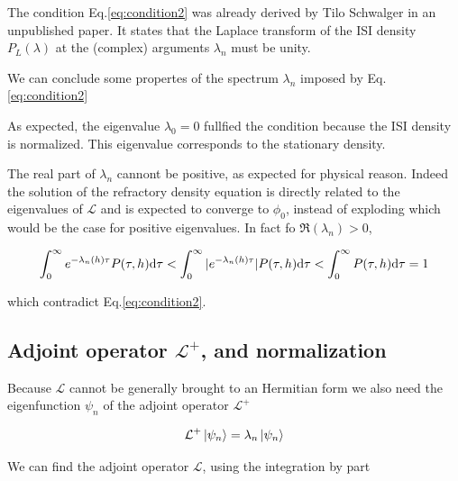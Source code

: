 \documentclass[a4paper,11pt,twoside]{article}
\def \dd  {{\rm d}}
\numberwithin{equation}{section}
\begin{document}
The condition Eq.\eqref{eq:condition2} was already derived by Tilo Schwalger in an unpublished paper. It states that the Laplace transform of the ISI density $P_L(\lambda)$ at the (complex) arguments $\lambda_{n}$ must be unity. 

We can conclude some propertes of the spectrum {$\lambda_n$} imposed by Eq.\eqref{eq:condition2}

As expected, the eigenvalue $\lambda_0=0$ fullfied the condition because the ISI  density is normalized. This eigenvalue corresponds to the stationary density.

The real part of $\lambda_n$ cannont be positive, as expected for physical reason. Indeed the solution of the refractory density equation is directly related to the eigenvalues of $\mathcal{L}$ and is expected to converge to $\phi_0$, instead of exploding which would be the case for positive eigenvalues. In fact fo $\Re(\lambda_n)>0$,

\begin{equation}
\int_0^\infty e^{-\lambda_n(h) \tau} P(\tau,h) \dd\tau<\int_0^\infty |e^{-\lambda_n(h) \tau} |P(\tau,h) \dd\tau<\int_0^\infty P(\tau,h) \dd\tau=1
\end{equation}

which contradict Eq.\eqref{eq:condition2}.



\subsection{Adjoint operator $\mathcal{L}^+$, and normalization}

Because $\mathcal{L}$ cannot be generally brought to an Hermitian form we also need  the eigenfunction $\psi_n$ of the adjoint operator  $\mathcal{L}^{+}$

\begin{equation}
\label{eq:Ldegaoperator}
\mathcal{L}^+\ket{\psi_n}=\lambda_n\ket{\psi_n}
\end{equation}

We can find the adjoint operator $\mathcal{L}$, using the integration by part
\end{document}
